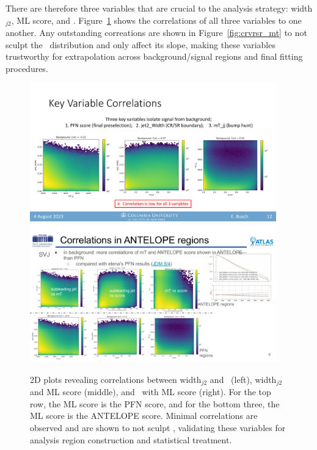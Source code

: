 There are therefore three variables that are crucial to the analysis strategy: width$_{j2}$, ML score, and \mt.
Figure~\ref{fig:bkg_correlations} shows the correlations of all three variables to one another.
Any outstanding correations are shown in Figure~\ref{fig:crvrsr_mt} to not sculpt the \mt~distribution and only affect its slope, making these variables trustworthy for extrapolation across background/signal regions and final fitting procedures.
\begin{figure}[!htbp]
\centering
   \includegraphics[width=0.95\textwidth]{figures/background/bkg_correlations}
   \includegraphics[width=0.95\textwidth]{figures/background/bkg_correlations_antelope}
    \caption{2D plots revealing correlations between width$_{j2}$ and \mt~(left), width$_{j2}$ and ML score (middle), and \mt~with ML score (right). For the top row, the ML score is the PFN score, and for the bottom three, the ML score is the ANTELOPE score. Minimal correlations are observed and are shown to not sculpt \mt, validating these variables for analysis region construction and statistical treatment.
    \label{fig:bkg_correlations}}
\end{figure}


